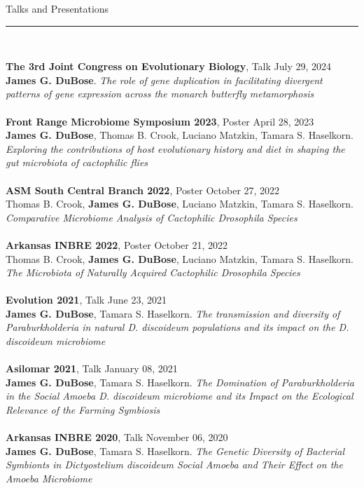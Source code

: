 \documentclass{article}
\begin{document}
\begin{flushleft}
{\Large Talks and Presentations} \rule{16.51cm}{0.4pt}\\
\end{flushleft}
\textbf{The 3rd Joint Congress on Evolutionary Biology}, Talk \hfill July 29, 2024\\
\textbf{James G. DuBose}. \emph{The role of gene duplication in facilitating divergent patterns of gene expression across the monarch butterfly metamorphosis}\\
\\
\textbf{Front Range Microbiome Symposium 2023}, Poster \hfill April 28, 2023\\
\textbf{James G. DuBose}, Thomas B. Crook, Luciano Matzkin, Tamara S. Haselkorn. \emph{Exploring the contributions of host evolutionary history and diet in shaping the gut microbiota of cactophilic flies}\\
\\
\textbf{ASM South Central Branch 2022}, Poster \hfill October 27, 2022\\
Thomas B. Crook, \textbf{James G. DuBose}, Luciano Matzkin, Tamara S. Haselkorn. \emph{Comparative Microbiome Analysis of Cactophilic Drosophila Species}\\
\\
\textbf{Arkansas INBRE 2022}, Poster \hfill October 21, 2022\\
Thomas B. Crook, \textbf{James G. DuBose}, Luciano Matzkin, Tamara S. Haselkorn. \emph{The Microbiota of Naturally Acquired Cactophilic Drosophila Species}\\
\\
\textbf{Evolution 2021}, Talk \hfill June 23, 2021\\
\textbf{James G. DuBose}, Tamara S. Haselkorn. \emph{The transmission and diversity of Paraburkholderia in natural D. discoideum populations and its impact on the D. discoideum microbiome}\\
\\
\textbf{Asilomar 2021}, Talk \hfill January 08, 2021\\
\textbf{James G. DuBose}, Tamara S. Haselkorn. \emph{The Domination of Paraburkholderia in the Social Amoeba D. discoideum microbiome and its Impact on the Ecological Relevance of the Farming Symbiosis}\\
\\
\textbf{Arkansas INBRE 2020}, Talk \hfill November 06, 2020\\
\textbf{James G. DuBose}, Tamara S. Haselkorn. \emph{The Genetic Diversity of Bacterial Symbionts in Dictyostelium discoideum Social Amoeba and Their Effect on the Amoeba Microbiome}\\
\end{document}
